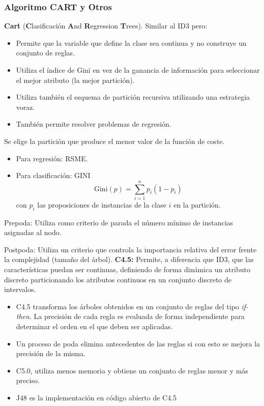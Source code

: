 \subsubsection{Algoritmo CART y Otros}
\textbf{Cart} (\textbf{C}lasificación \textbf{A}nd \textbf{R}egression \textbf{T}rees). Similar al ID3 pero:
\begin{itemize}
	\item Permite que la variable que define la clase sea continua y no construye un conjunto de reglas.
	\item Utiliza el índice de Gini en vez de la ganancia de información para seleccionar el mejor atributo (la mejor partición).
	\item Utiliza también el esquema de partición recursiva utilizando una estrategia voraz.
	\item También permite resolver problemas de regresión.
\end{itemize}
Se elige la partición que produce el menor valor de la función de coste.
\begin{itemize}
	\item Para regresión: RSME.
	\item Para clasificación: GINI \[ \mathrm{Gini}(p)=\sum_{i=1}^{n}p_i(1-p_i) \] con $p_i$ las proposiciones de instancias de la clase $i$ en la partición.
\end{itemize}
Prepoda: Utiliza como criterio de parada el número mínimo de instancias asignadas al nodo.

Postpoda: Utiliza un criterio que controla la importancia relativa del error frente la complejidad (tamaño del árbol).
\textbf{C4.5:} Permite, a diferencia que ID3, que las características puedan ser continuas, definiendo de forma dinámica un atributo discreto particionando los atributos continuos en un conjunto discreto de intervalos.
\begin{itemize}
	\item C4.5 transforma los árboles obtenidos en un conjunto de reglas del tipo \textit{if-then}. La precisión de cada regla es evaluada de forma independiente para determinar el orden en el que deben ser aplicadas.
	\item Un proceso de poda elimina antecedentes de las reglas si con esto se mejora la precisión de la misma.
	\item C5.0, utiliza menos memoria y obtiene un conjunto de reglas menor y más preciso.
	\item J48 es la implementación en código abierto de C4.5
\end{itemize}
